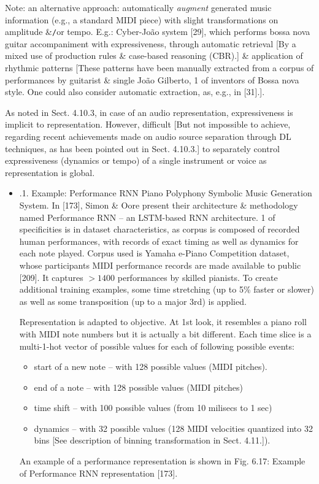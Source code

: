 \documentclass{article}
\begin{document}
\begin{itemize}
\begin{itemize}
		Note: an alternative approach: automatically {\it augment} generated music information (e.g., a standard MIDI piece) with slight transformations on amplitude \&{\tt/}or tempo. E.g.: Cyber-João system [29], which performs bossa nova guitar accompaniment with expressiveness, through automatic retrieval [By a mixed use of production rules \& case-based reasoning (CBR).] \& application of rhythmic patterns [These patterns have been manually extracted from a corpus of performances by guitarist \& single {\sc João Gilberto}, 1 of inventors of Bossa nova style. One could also consider automatic extraction, as, e.g., in [31].].

		As noted in Sect. 4.10.3, in case of an audio representation, expressiveness is implicit to representation. However, difficult [But not impossible to achieve, regarding recent achievements made on audio source separation through DL techniques, as has been pointed out in Sect. 4.10.3.] to separately control expressiveness (dynamics or tempo) of a single instrument or voice as representation is global.
		\begin{itemize}
			\item {.1. Example: Performance RNN Piano Polyphony Symbolic Music Generation System.} In [173], {\sc Simon \& Oore} present their architecture \& methodology named Performance RNN -- an LSTM-based RNN architecture. 1 of specificities is in dataset characteristics, as corpus is composed of recorded human performances, with records of exact timing as well as dynamics for each note played. Corpus used is Yamaha e-Piano Competition dataset, whose participants MIDI performance records are made available to public [209]. It captures $> 1400$ performances by skilled pianists. To create additional training examples, some time stretching (up to 5\% faster or slower) as well as some transposition (up to a major 3rd) is applied.

			Representation is adapted to objective. At 1st look, it resembles a piano roll with MIDI note numbers but it is actually a bit different. Each time slice is a multi-1-hot vector of possible values for each of following possible events:
			\begin{itemize}
				\item start of a new note -- with 128 possible values (MIDI pitches).
				\item end of a note -- with 128 possible values (MIDI pitches)
				\item time shift -- with 100 possible values (from 10 milisecs to 1 sec)
				\item dynamics -- with 32 possible values (128 MIDI velocities quantized into 32 bins [See description of binning transformation in Sect. 4.11.]).
			\end{itemize}
			An example of a performance representation is shown in {\sf Fig. 6.17: Example of Performance RNN representation [173].}


\end{itemize}
\end{itemize}
\end{itemize}
\end{document}
